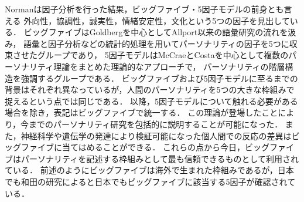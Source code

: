 Norman\cite{norman}は因子分析を行った結果，ビッグファイブ・5因子モデルの前身とも言える
外向性，協調性，誠実性，情緒安定性，文化という5つの因子を見出している．
ビッグファイブはGoldberg\cite{goldberg-1981, goldberg-1990, goldberg-1992}を中心としてAllport以来の語彙研究の流れを汲み，
語彙と因子分析などの統計的処理を用いてパーソナリティの因子を5つに収束させたグループであり，
5因子モデルはMcCraeとCosta\cite{mccrae-1987, mccrae-1992}を中心として複数のパーソナリティ理論をまとめた理論的なアプローチで，
パーソナリティの階層構造を強調するグループである\cite{first-personality}．
ビッグファイブおよび5因子モデルに至るまでの背景はそれぞれ異なっているが，人間のパーソナリティを5つの大きな枠組みで捉えるという点では同じである．
以降，5因子モデルについて触れる必要がある場合を除き，表記はビッグファイブで統一する．
この理論が登場したことにより，今までのパーソナリティ研究を包括的に説明することが可能になった．
また，神経科学や遺伝学の発達により検証可能になった個人間での反応の差異はビッグファイブに当てはめることができる．
これらの点から今日，ビッグファイブはパーソナリティを記述する枠組みとして最も信頼できるものとして利用されている．
前述のようにビッグファイブは海外で生まれた枠組みであるが，日本でも和田\cite{wada}の研究によると日本でもビッグファイブに該当する5因子が確認されている．

